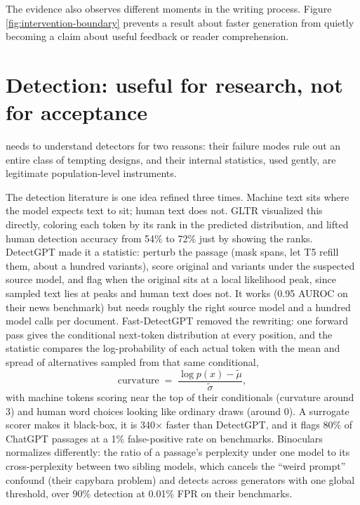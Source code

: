 The evidence also observes different moments in the writing process. Figure
\ref{fig:intervention-boundary} prevents a result about faster generation from
quietly becoming a claim about useful feedback or reader comprehension.

\hvFigureInterventionBoundary

\section{Detection: useful for research, not for acceptance}
\label{sec:lit-detection}

\hv{} needs to understand detectors for two reasons: their failure modes
rule out an entire class of tempting designs, and their internal statistics,
used gently, are legitimate population-level instruments.

The detection literature is one idea refined three times. Machine text sits
where the model expects text to sit; human text does not. GLTR
\citep{gehrmann2019gltr} visualized this directly, coloring each token by
its rank in the predicted distribution, and lifted human detection accuracy
from 54\% to 72\% just by showing the ranks. DetectGPT
\citep{mitchell2023detectgpt} made it a statistic: perturb the passage
(mask spans, let T5 refill them, about a hundred variants), score original
and variants under the suspected source model, and flag when the original
sits at a local likelihood peak, since sampled text lies at peaks and human
text does not. It works (0.95 AUROC on their news benchmark) but needs
roughly the right source model and a hundred model calls per document.
Fast-DetectGPT \citep{bao2024fastdetect} removed the rewriting: one forward
pass gives the conditional next-token distribution at every position, and
the statistic compares the log-probability of each actual token with the
mean and spread of alternatives sampled from that same conditional,
\begin{equation}
\text{curvature} \;=\; \frac{\log p(x) - \tilde{\mu}}{\tilde{\sigma}},
\label{eq:fdg}
\end{equation}
with machine tokens scoring near the top of their conditionals (curvature
around 3) and human word choices looking like ordinary draws (around 0). A
surrogate scorer makes it black-box, it is 340$\times$ faster than
DetectGPT, and it flags 80\% of ChatGPT passages at a 1\% false-positive
rate on benchmarks. Binoculars \citep{hans2024binoculars} normalizes
differently: the ratio of a passage's perplexity under one model to its
cross-perplexity between two sibling models, which cancels the ``weird
prompt'' confound (their capybara problem) and detects across generators
with one global threshold, over 90\% detection at 0.01\% FPR on their
benchmarks.

